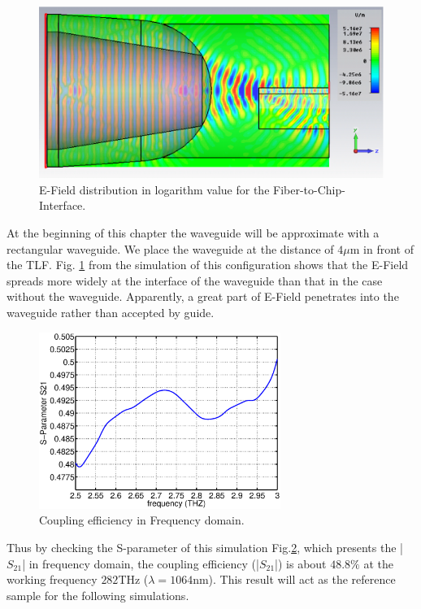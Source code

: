 \begin{figure}[!ht]
\centering
	\includegraphics[width=0.7 \textwidth]{bilder/cst_basic_waveguide_efield}
	\caption{E-Field distribution in logarithm value for the Fiber-to-Chip-Interface.}	
	\label{fig:coupling_e_field}
\end{figure}
At the beginning of this chapter the waveguide will be approximate with a rectangular waveguide. We place the waveguide at the distance of $4\mu$m in front of the TLF.  Fig. \ref{fig:coupling_e_field} from the simulation of this configuration shows that the E-Field spreads more widely at the interface of the waveguide than that in the case without the waveguide. Apparently, a great part of E-Field penetrates into the waveguide rather than accepted by guide.\\
 
\begin{figure}[!ht]
\centering
\includegraphics[width=0.7\textwidth]{bilder/original_coupling_efficiency}
\caption{Coupling efficiency in Frequency domain.}
\label{fig:orignial_coupling_efficiency}
\end{figure}
Thus by checking the S-parameter of this simulation Fig.\ref{fig:orignial_coupling_efficiency}, which presents the |$S_{21}$| in frequency domain, the coupling efficiency (|$S_{21}$|) is about $48.8\%$ at the working frequency $282$THz ($\lambda=1064$nm). This result will act as the reference sample for the following simulations.\\ 

